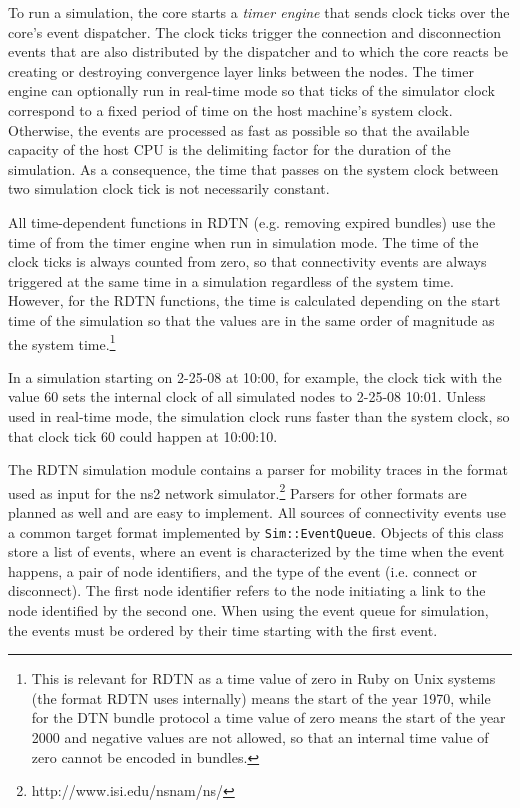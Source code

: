 \documentclass{article}
\begin{document}
To run a simulation, the core starts a {\em timer engine} that sends clock ticks
over the core's event dispatcher. The clock ticks trigger the connection and
disconnection events that are also distributed by the dispatcher and to which
the core reacts be creating or destroying convergence layer links between the
nodes. The timer engine can optionally run in real-time mode so that ticks of
the simulator clock correspond to a fixed period of time on the host machine's
system clock. Otherwise, the events are processed as fast as possible so that
the available capacity of the host CPU is the delimiting factor for the duration
of the simulation. As a consequence, the time that passes on the system clock
between two simulation clock tick is not necessarily constant.

All time-dependent functions in RDTN (e.g. removing expired bundles) use the
time of from the timer engine when run in simulation mode.  The time of the
clock ticks is always counted from zero, so that connectivity events are always
triggered at the same time in a simulation regardless of the system time.
However, for the RDTN functions, the time is calculated depending on the start
time of the simulation so that the values are in the same order of magnitude as
the system time.\footnote{This is relevant for RDTN as a time value of zero in
Ruby on Unix systems (the format RDTN uses internally) means the start of the
year 1970, while for the DTN bundle protocol a time value of zero means the
start of the year 2000 and negative values are not allowed, so that an internal
time value of zero cannot be encoded in bundles.}

In a simulation starting on 2-25-08 at 10:00, for example, the clock tick
with the value $60$ sets the internal clock of all simulated nodes to 2-25-08
10:01. Unless used in real-time mode, the simulation clock runs faster than the
system clock, so that clock tick $60$ could happen at 10:00:10.

The RDTN simulation module contains a parser for mobility traces in the format
used as input for the ns2 network
simulator.\footnote{http://www.isi.edu/nsnam/ns/} Parsers for other formats are
planned as well and are easy to implement. All sources of connectivity events
use a common target format implemented by {\tt Sim::EventQueue}. Objects of this
class store a list of events, where an event is characterized by the time when
the event happens, a pair of node identifiers, and the type of the event (i.e.
connect or disconnect). The first node identifier refers to the node initiating
a link to the node identified by the second one. When using the event queue for
simulation, the events must be ordered by their time starting with the first
event.
\end{document}
